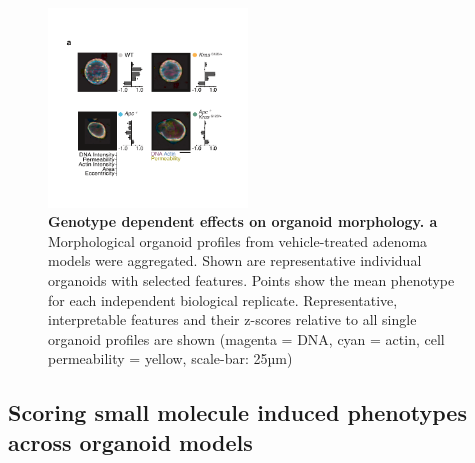 \begin{flushleft}
\begin{figure}[h!]
\centering
\includegraphics[width=200,
                height=\textheight,
                keepaspectratio]{figures/adenomaprofiling/pdf/fig_1_3.pdf}
\caption[Genotype dependent effects on organoid morphology]{\textbf{Genotype dependent effects on organoid morphology. a}  Morphological organoid profiles from vehicle-treated adenoma models were aggregated. Shown are representative individual organoids with selected features. Points show the mean phenotype for each independent biological replicate. Representative, interpretable features and their z-scores relative to all single organoid profiles are shown (magenta = DNA, cyan = actin, cell permeability = yellow, scale-bar: 25µm)}
\label{fig_130}
\end{figure}
\bigbreak



\subsection{Scoring small molecule induced phenotypes across organoid models}


\end{flushleft}
